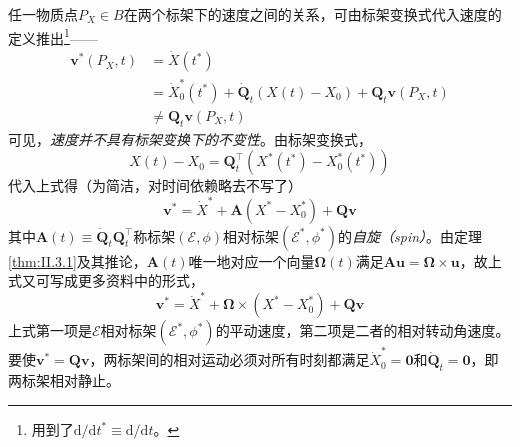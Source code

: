 \documentclass[main.tex]{subfiles}
\begin{document}
任一物质点$P_X\in B$在两个标架下的速度之间的关系，可由标架变换式代入速度的定义推出\footnote{用到了$\mathrm{d}/\mathrm{d}t^*\equiv\mathrm{d}/\mathrm{d}t$。}——
\begin{align*}
    \mathbf{v}^*\left(P_X,t\right) & =\dot{X}\left(t^*\right)                                                                                                 \\
                                   & =\dot{X}_0^*\left(t^*\right)+\dot{\mathbf{Q}}_t\left(X\left(t\right)-X_0\right)+\mathbf{Q}_t\mathbf{v}\left(P_X,t\right) \\
                                   & \neq\mathbf{Q}_t\mathbf{v}\left(P_X,t\right)
\end{align*}
可见，\emph{速度并不具有标架变换下的不变性}。由标架变换式，
\[X\left(t\right)-X_0=\mathbf{Q}_t^\intercal\left(X^*\left(t^*\right)-X_0^*\left(t^*\right)\right)\]
代入上式得（为简洁，对时间依赖略去不写了）
\[\mathbf{v}^*=\dot{X}^*+\mathbf{A}\left(X^*-X_0^*\right)+\mathbf{Qv}\]
其中$\mathbf{A}\left(t\right)\equiv\dot{\mathbf{Q}}_t\mathbf{Q}_t^\intercal$称标架$\left(\mathcal{E},\phi\right)$相对标架$\left(\mathcal{E}^*,\phi^*\right)$的\emph{自旋（spin）}。由定理\ref{thm:II.3.1}及其推论，$\mathbf{A}\left(t\right)$唯一地对应一个向量$\boldsymbol{\Omega}\left(t\right)$满足$\mathbf{Au}=\boldsymbol{\Omega}\times\mathbf{u}$，故上式又可写成更多资料中的形式，
\[\mathbf{v}^*=\dot{X}^*+\boldsymbol{\Omega}\times\left(X^*-X_0^*\right)+\mathbf{Qv}\]
上式第一项是$\mathcal{E}$相对标架$\left(\mathcal{E}^*,\phi^*\right)$的平动速度，第二项是二者的相对转动角速度。要使$\mathbf{v}^*=\mathbf{Qv}$，两标架间的相对运动必须对所有时刻都满足$\dot{X}_0^*=\mathbf{0}$和$\dot{\mathbf{Q}}_t=\mathbf{0}$，即两标架相对静止。
\end{document}
